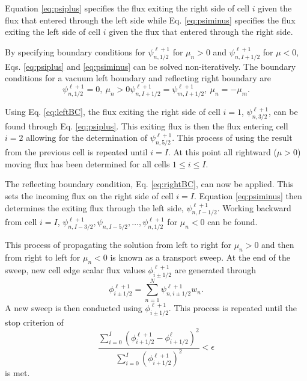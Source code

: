 	Equation \ref{eq:psiplus} specifies the flux exiting the right side of cell $i$ given the flux that entered through the left side while Eq. \ref{eq:psiminus} specifies the flux exiting the left side of cell $i$ given the flux that entered through the right side. 

	By specifying boundary conditions for $\psi_{n,1/2}^{\ell+1}$ for $\mu_n>0$ and $\psi_{n,I+1/2}^{\ell+1}$ for $\mu<0$, Eqs. \ref{eq:psiplus} and \ref{eq:psiminus} can be solved non-iteratively. The boundary conditions for a vacuum left boundary and reflecting right boundary are 
		\begin{subequations}
		\begin{equation} \label{eq:leftBC}
			\psi_{n,1/2}^{\ell+1} = 0, \ \mu_n > 0
		\end{equation}
		\begin{equation} \label{eq:rightBC}
			\psi_{n,I+1/2}^{\ell+1} = \psi_{m,I+1/2}^{\ell+1}, \ \mu_n = -\mu_m.
		\end{equation}
		\end{subequations}

	Using Eq. \ref{eq:leftBC}, the flux exiting the right side of cell $i=1$, $\psi_{n,3/2}^{\ell+1}$, can be found through Eq. \ref{eq:psiplus}. This exiting flux is then the flux entering cell $i=2$ allowing for the determination of $\psi_{n,5/2}^{\ell+1}$. This process of using the result from the previous cell is repeated until $i=I$. At this point all rightward ($\mu>0$) moving flux has been determined for all cells $1 \leq i \leq I$. 

	The reflecting boundary condition, Eq. \ref{eq:rightBC}, can now be applied. This sets the incoming flux on the right side of cell $i=I$. Equation \ref{eq:psiminus} then determines the exiting flux through the left side, $\psi_{n,I-1/2}^{\ell+1}$. Working backward from cell $i=I$, $\psi_{n,I-3/2}^{\ell+1}, \psi_{n,I-5/2}, \dots, \psi_{n,1/2}^{\ell+1}$ for $\mu_n < 0$ can be found. 

	This process of propagating the solution from left to right for $\mu_n > 0$ and then from right to left for $\mu_n < 0$ is known as a transport sweep. At the end of the sweep, new cell edge scalar flux values $\phi_{i\pm1/2}^{\ell+1}$ are generated through 
		\begin{equation}
			\phi_{i\pm1/2}^{\ell+1} = \sum_{n=1}^N \psi_{n,i\pm1/2}^{\ell+1} w_n. 
		\end{equation}
	A new sweep is then conducted using $\phi_{i\pm1/2}^{\ell+1}$. This process is repeated until the stop criterion of 
		\begin{equation}
			\frac{
			\sum_{i=0}^{I} \left(\phi_{i+1/2}^{\ell+1} - \phi_{i+1/2}^\ell\right)^2
			}{
			\sum_{i=0}^{I} \left(\phi_{i+1/2}^{\ell+1}\right)^2
			}
			< \epsilon
		\end{equation}
	is met. 